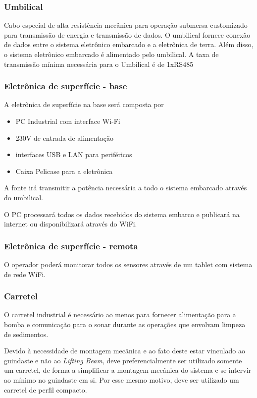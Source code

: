 \subsubsection{Umbilical}

Cabo especial  de alta resistência mecânica para operação submersa customizado para transmissão de energia e transmissão de dados. O umbilical fornece conexão de dados entre o sistema eletrônico embarcado e a eletrônica de terra. Além disso, o sistema eletrônico embarcado é alimentado pelo umbilical. A taxa de transmissão mínima necessária para o Umbilical é de 1xRS485 

\subsubsection{Eletrônica de superfície - base}

A eletrônica de superfície na base será composta por

\begin{itemize}
	\item PC Industrial com interface Wi-Fi
	\item 230V de entrada de alimentação 
	\item interfaces USB e LAN para periféricos 
	\item Caixa Pelicase para a eletrônica
\end{itemize}

A fonte irá transmitir a potência necessária a todo o sistema embarcado
através do umbilical.

O PC processará todos os dados recebidos do sistema embarco e publicará na
internet ou disponibilizará através do WiFi.

\subsubsection{Eletrônica de superfície - remota}
O operador poderá monitorar todos os sensores através de um tablet com sistema
de rede WiFi. 

\subsubsection{Carretel}
O carretel industrial é necessário ao menos para fornecer alimentação para a
bomba e comunicação para o sonar durante as operações que envolvam limpeza de
sedimentos.
 
Devido à necessidade de montagem mecânica e ao fato deste estar vinculado ao
guindaste e não ao \textit{Lifting Beam}, deve preferencialmente ser utilizado
somente um carretel, de forma a simplificar a montagem mecânica do sistema e se
intervir ao mínimo no guindaste em si. Por esse mesmo motivo, deve ser utilizado
um carretel de perfil compacto.
 
